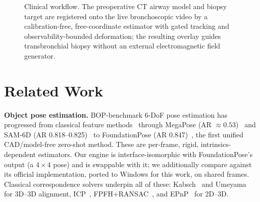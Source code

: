 \documentclass[9pt,twoside,web]{ieeecolor2}
\begin{document}
\begin{figure}[!b]
\centering
{}
\caption{Clinical workflow. The preoperative CT airway model and biopsy target are registered onto the live bronchoscopic video by a calibration-free, free-coordinate estimator with gated tracking and observability-bounded deformation; the resulting overlay guides transbronchial biopsy without an external electromagnetic field generator.}
\label{fig:workflow}
\end{figure}

\section{Related Work}\label{sec:related}

\textbf{Object pose estimation.} BOP-benchmark 6-DoF pose estimation has progressed from classical feature methods~\cite{hodan2018bop} through MegaPose (AR $\approx0.53$)~\cite{labbe2022megapose} and SAM-6D (AR 0.818--0.825)~\cite{lin2024sam6d} to FoundationPose (AR 0.847)~\cite{wen2024foundationpose}, the first unified CAD/model-free zero-shot method. These are per-frame, rigid, intrinsics-dependent estimators. Our engine is interface-isomorphic with FoundationPose's output (a $4\times4$ pose) and is swappable with it; we additionally compare against its official implementation, ported to Windows for this work, on shared frames. Classical correspondence solvers underpin all of these: Kabsch~\cite{kabsch1976} and Umeyama~\cite{umeyama1991} for 3D--3D alignment, ICP~\cite{besl1992icp}, FPFH+RANSAC~\cite{rusu2009fpfh,fischler1981ransac}, and EPnP~\cite{lepetit2009epnp} for 2D--3D.
\end{document}

